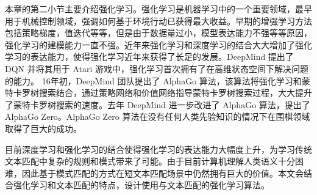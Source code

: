 本章的第二小节主要介绍强化学习。强化学习是机器学习中的一个重要领域，最早用于机械控制领域，强调如何基于环境行动已获得最大收益。早期的增强学习方法包括策略梯度，值迭代等等，但是由于数据量过小，模型表达能力不强等等原因，强化学习的建模能力一直不强。近年来强化学习和深度学习的结合大大增加了强化学习的表达能力，使得强化学习近年来获得了长足的发展。DeepMind 提出了 DQN 并将其用于 Atari 游戏中，强化学习首次拥有了在高维状态空间下解决问题的能力。
16年初，DeepMind 团队提出了 AlphaGo 算法，该算法将强化学习和蒙特卡罗树搜索结合，通过策略网络和价值网络指导蒙特卡罗树搜索过程，大大提升了蒙特卡罗树搜索的速度。去年 DeepMind 进一步改进了 AlphaGo 算法，提出了 AlphaGo Zero。AlphaGo Zero 算法在没有任何人类先验知识的情况下在围棋领域取得了巨大的成功。

目前深度学习和强化学习的结合使得强化学习的表达能力大幅度上升，为学习传统文本匹配中复杂的规则和模式带来了可能。由于目前计算机理解人类语义十分困难，因此基于模式匹配的方式在短文本匹配场景中仍然拥有巨大的价值。本文会结合强化学习和文本匹配的特点，设计使用与文本匹配的强化学习算法。
